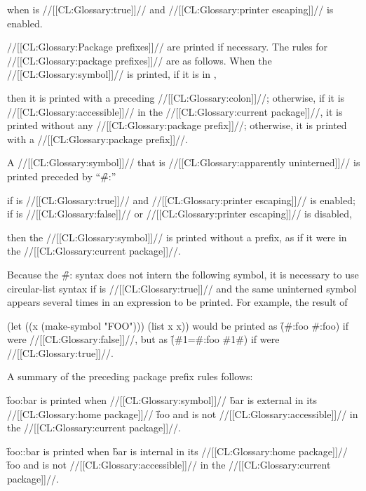 when  is //[[CL:Glossary:true]]//
and //[[CL:Glossary:printer escaping]]// is enabled.





//[[CL:Glossary:Package prefixes]]// are printed if necessary.
The rules for //[[CL:Glossary:package prefixes]]// are as follows.
When the //[[CL:Glossary:symbol]]// is printed, if it is in , 

then it is printed with a preceding //[[CL:Glossary:colon]]//; otherwise, if
it is //[[CL:Glossary:accessible]]// in the //[[CL:Glossary:current package]]//, it is printed without any
//[[CL:Glossary:package prefix]]//; otherwise, it is printed with a //[[CL:Glossary:package prefix]]//.


A //[[CL:Glossary:symbol]]// that is //[[CL:Glossary:apparently uninterned]]// is printed
preceded by ``\f{\#:}'' 


if  is //[[CL:Glossary:true]]// and //[[CL:Glossary:printer escaping]]// is enabled;
if  is //[[CL:Glossary:false]]// or //[[CL:Glossary:printer escaping]]// is disabled,

then the //[[CL:Glossary:symbol]]// is printed without a prefix,
as if it were in the //[[CL:Glossary:current package]]//.


Because the \f{\#:} syntax does not intern the
following symbol, it is necessary to use circular-list syntax
if  is //[[CL:Glossary:true]]// and
the same uninterned symbol appears several times in an expression
to be printed.  For example, the result of

\code
 (let ((x (make-symbol "FOO"))) (list x x))
\endcode
would be printed as \f{(\#:foo \#:foo)} if 
were //[[CL:Glossary:false]]//, but as \f{(\#1=\#:foo \#1\#)} if 
were //[[CL:Glossary:true]]//.

A summary of the preceding package prefix rules follows:

\beginlist
{}

\f{foo:bar} is printed when //[[CL:Glossary:symbol]]// \f{bar} 
is external in its //[[CL:Glossary:home package]]// \f{foo} 
and is not //[[CL:Glossary:accessible]]// in the //[[CL:Glossary:current package]]//.
         

\f{foo::bar} is printed when \f{bar} is internal in its //[[CL:Glossary:home package]]//
\f{foo} and is not //[[CL:Glossary:accessible]]// in the //[[CL:Glossary:current package]]//.
         
